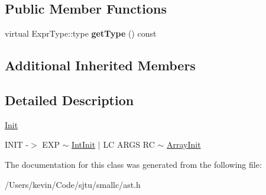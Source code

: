 \subsection*{Public Member Functions}
\begin{DoxyCompactItemize}
\item 
\mbox{\label{class_init_a6eafedc3e8a1797cb1ac780438acdd31}} 
virtual Expr\+Type\+::type {\bfseries get\+Type} () const
\end{DoxyCompactItemize}
\subsection*{Additional Inherited Members}


\subsection{Detailed Description}
\hyperlink{class_init}{Init}

I\+N\+IT -\/$>$ E\+XP $\sim$ \hyperlink{class_int_init}{Int\+Init} $\vert$ LC A\+R\+GS RC $\sim$ \hyperlink{class_array_init}{Array\+Init} 

The documentation for this class was generated from the following file\+:\begin{DoxyCompactItemize}
\item 
/\+Users/kevin/\+Code/sjtu/smallc/ast.\+h\end{DoxyCompactItemize}
